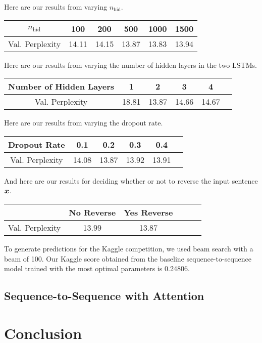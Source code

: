 \documentclass[11pt]{article}
\begin{document}
Here are our results from varying $n_\text{hid}$.  

\begin{center}
	\begin{tabular}{ c | c c c c c}
		 $n_\text{hid}$ & 100 & 200 & 500 & 1000 & 1500  \\
		\hline
		Val. Perplexity & 14.11 & 14.15 & 13.87 & 13.83 & 13.94
	\end{tabular}
\end{center}    

Here are our results from varying the number of hidden layers in the two LSTMs.  

\begin{center}
	\begin{tabular}{ c | c c c c c}
		 Number of Hidden Layers & 1 & 2 & 3 & 4   \\
		\hline
		Val. Perplexity & 18.81 & 13.87 & 14.66 & 14.67
	\end{tabular}
\end{center}    

Here are our results from varying the dropout rate. 

\begin{center}
	\begin{tabular}{ c | c c c c c}
		 Dropout Rate & 0.1 & 0.2 & 0.3 & 0.4   \\
		\hline
		Val. Perplexity & 14.08 & 13.87 & 13.92 & 13.91
	\end{tabular}
\end{center} 

And here are our results for deciding whether or not to reverse the input sentence $\boldsymbol{x}$.  
\begin{center}
	\begin{tabular}{ c | c c c c c}
		  & No Reverse & Yes Reverse   \\
		\hline
		Val. Perplexity & 13.99 & 13.87
	\end{tabular}
\end{center} 

To generate predictions for the Kaggle competition, we used beam search with a beam of 100.  Our Kaggle score obtained from the baseline sequence-to-sequence model trained with the most optimal parameters is 0.24806.   

\subsection{Sequence-to-Sequence with Attention}

\section{Conclusion}




\nocite{*}

\end{document}
